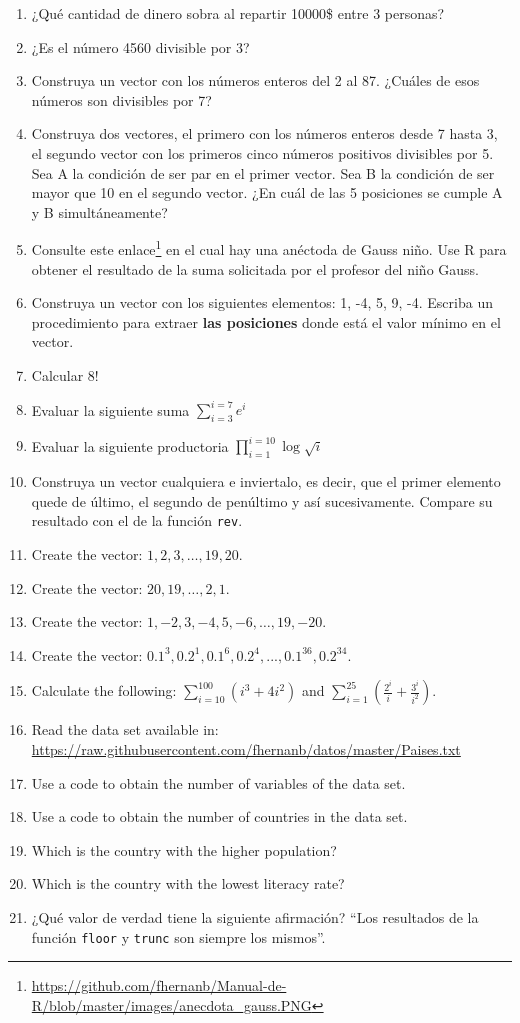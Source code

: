 \documentclass[
]{book}
\providecommand{\tightlist}{%
  \setlength{\itemsep}{0pt}\setlength{\parskip}{0pt}}
\renewcommand{\href}[2]{#2\footnote{\url{#1}}}
\begin{document}
\begin{enumerate}
\def\labelenumi{\arabic{enumi}.}
\tightlist
\item
  ¿Qué cantidad de dinero sobra al repartir 10000\$ entre 3 personas?
\item
  ¿Es el número 4560 divisible por 3?
\item
  Construya un vector con los números enteros del 2 al 87. ¿Cuáles de esos números son divisibles por 7?
\item
  Construya dos vectores, el primero con los números enteros desde 7 hasta 3, el segundo vector con los primeros cinco números positivos divisibles por 5. Sea A la condición de ser par en el primer vector. Sea B la condición de ser mayor que 10 en el segundo vector. ¿En cuál de las 5 posiciones se cumple A y B simultáneamente?
\item
  Consulte \href{https://github.com/fhernanb/Manual-de-R/blob/master/images/anecdota_gauss.PNG}{este enlace} en el cual hay una anéctoda de Gauss niño. Use R para obtener el resultado de la suma solicitada por el profesor del niño Gauss.
\item
  Construya un vector con los siguientes elementos: 1, -4, 5, 9, -4. Escriba un procedimiento para extraer \textbf{las posiciones} donde está el valor mínimo en el vector.
\item
  Calcular \(8!\)
\item
  Evaluar la siguiente suma \(\sum_{i=3}^{i=7}e^i\)
\item
  Evaluar la siguiente productoria \(\prod_{i=1}^{i=10}\log\sqrt{i}\)
\item
  Construya un vector cualquiera e inviertalo, es decir, que el primer elemento quede de último, el segundo de penúltimo y así sucesivamente. Compare su resultado con el de la función \texttt{rev}.
\item
  Create the vector: \(1, 2, 3, \ldots, 19, 20\).
\item
  Create the vector: \(20, 19, \ldots , 2, 1\).
\item
  Create the vector: \(1, -2, 3, -4, 5, -6, \ldots, 19, -20\).
\item
  Create the vector: \(0.1^3, 0.2^1, 0.1^6, 0.2^4, . . . , 0.1^{36}, 0.2^{34}\).
\item
  Calculate the following: \(\sum_{i=10}^{100}(i^3+4i^2)\) and \(\sum_{i=1}^{25}\left( \frac{2^i}{i} + \frac{3^i}{i^2} \right)\).
\item
  Read the data set available in: \url{https://raw.githubusercontent.com/fhernanb/datos/master/Paises.txt}
\item
  Use a code to obtain the number of variables of the data set.
\item
  Use a code to obtain the number of countries in the data set.
\item
  Which is the country with the higher population?
\item
  Which is the country with the lowest literacy rate?
\item
  ¿Qué valor de verdad tiene la siguiente afirmación? ``Los resultados de la función \texttt{floor} y \texttt{trunc} son siempre los mismos''.
\end{enumerate}
\end{document}

